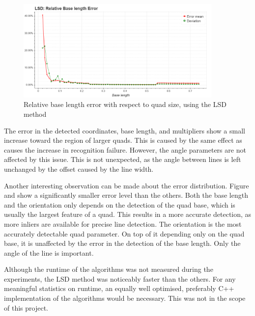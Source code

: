 \begin{figure}[ht]
	\centering
	\includegraphics[width=0.9\textwidth]{figures/plots/lsd_relative_base_length_error.png}
	\caption{Relative base length error with respect to quad size, using the LSD method}
	\label{fig:lsdRelBaseErr}
\end{figure}
The error in the detected coordinates, base length, and multipliers show a small increase toward the region of larger quads.
This is caused by the same effect as causes the increase in recognition failure.
However, the angle parameters are not affected by this issue.
This is not unexpected, as the angle between lines is left unchanged by the offset caused by the line width. 

Another interesting observation can be made about the error distribution.
Figure  and  show a significantly smaller error level than the others.
Both the base length and the orientation only depends on the detection of the quad base, which is usually the largest feature of a quad.
This results in a more accurate detection, as more inliers are available for precise line detection.
The orientation is the most accurately detectable quad parameter. 
On top of it depending only on the quad base, it is unaffected by the error in the detection of the base length.
Only the angle of the line is important.

Although the runtime of the algorithms was not measured during the experiments, the LSD method was noticeably faster than the others.
For any meaningful statistics on runtime, an equally well optimised, preferably C++ implementation of the algorithms would be necessary.
This was not in the scope of this project.

